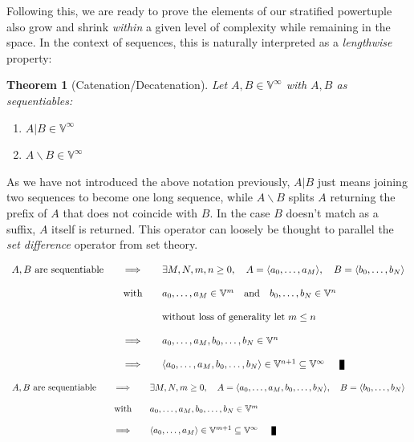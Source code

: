 \documentclass[twoside]{article}
\newcommand{\nthut}[2][V]{\ensuremath{\mathbb{#1}^{#2}}}
\newcommand{\restratified}{\ensuremath{\mathbb{V}^\infty}}
\newcommand{\then}{\ensuremath{\quad\Longrightarrow\quad}}
\newcommand{\with}{\ensuremath{\quad\mbox{with}\quad}}
\newtheorem{theorem}{Theorem}
\newenvironment{proof}[1][Proof]{\begin{trivlist}
\item[\hskip \labelsep {\bfseries #1}]}{\end{trivlist}}
\newcommand{\qed}{\nobreak \ifvmode \relax \else
      \ifdim\lastskip<1.5em \hskip-\lastskip
      \hskip1.5em plus0em minus0.5em \fi \nobreak
      \vrule height0.75em width0.5em depth0.25em\fi}
\begin{document}
Following this, we are ready to prove the elements of our stratified powertuple also grow and shrink \emph{within} a given level of
complexity while remaining in the space. In the context of sequences, this is naturally interpreted as a \emph{lengthwise} property:

\begin{theorem}[Catenation/Decatenation]
Let $ A,B\in\restratified $ with $ A,B $ as sequentiables:
\begin{enumerate}
\item $ A|B\in\restratified $
\item $ A\backslash B\in\restratified $
\end{enumerate}
\end{theorem}

As we have not introduced the above notation previously, $ A|B $ just means joining two sequences to become one long sequence,
while $ A\backslash B $ splits $ A $ returning the prefix of $ A $ that does not coincide with $ B $. In the case $ B $ doesn't
match as a suffix, $ A $ itself is returned. This operator can loosely be thought to parallel the \emph{set difference} operator
from set theory.

\begin{proof}
$$ \begin{array}{rcl}
A,B\mbox{ are sequentiable}	& \then & \exists M,N,m,n\ge 0,\quad A=\langle a_0,\ldots,a_M\rangle,
					  \quad B=\langle b_0,\ldots,b_N\rangle							\\
																\\
				& \with & a_0,\ldots,a_M\in\nthut{m}\quad\mbox{and}\quad b_0,\ldots,b_N\in\nthut{n}		\\
																\\
				&	& \mbox{without loss of generality let } m\le n						\\
																\\
				& \then & a_0,\ldots,a_M,b_0,\ldots,b_N\in\nthut{n}						\\
																\\
				& \then & \langle a_0,\ldots,a_M,b_0,\ldots,b_N\rangle\in\nthut{n+1}\subseteq\restratified\qed
\end{array} $$
\end{proof}

\begin{proof}
$$ \begin{array}{rcl}
A,B\mbox{ are sequentiable}	& \then & \exists M,N,m\ge 0,\quad A=\langle a_0,\ldots,a_M,b_0,\ldots,b_N\rangle,
					  \quad B=\langle b_0,\ldots,b_N\rangle							\\
																\\
				& \with & a_0,\ldots,a_M, b_0,\ldots,b_N\in\nthut{m}						\\
																\\
				& \then & \langle a_0,\ldots,a_M\rangle\in\nthut{m+1}\subseteq\restratified\qed
\end{array} $$
\end{proof}
\end{document}
